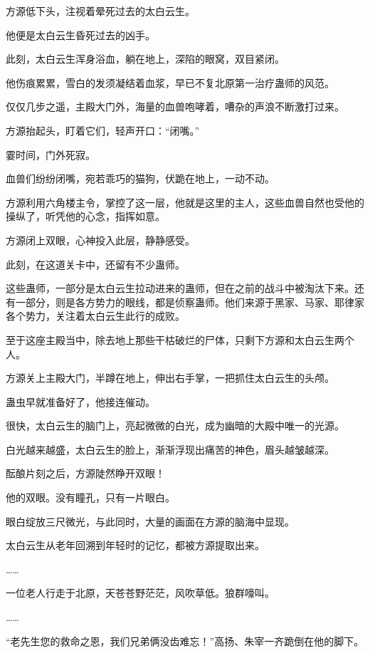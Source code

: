 
\begin{this_body}



方源低下头，注视着晕死过去的太白云生。

他便是太白云生昏死过去的凶手。

此刻，太白云生浑身浴血，躺在地上，深陷的眼窝，双目紧闭。

他伤痕累累，雪白的发须凝结着血浆，早已不复北原第一治疗蛊师的风范。

仅仅几步之遥，主殿大门外，海量的血兽咆哮着，嘈杂的声浪不断激打过来。

方源抬起头，盯着它们，轻声开口：“闭嘴。”

霎时间，门外死寂。

血兽们纷纷闭嘴，宛若乖巧的猫狗，伏跪在地上，一动不动。

方源利用六角楼主令，掌控了这一层，他就是这里的主人，这些血兽自然也受他的操纵了，听凭他的心念，指挥如意。

方源闭上双眼，心神投入此层，静静感受。

此刻，在这道关卡中，还留有不少蛊师。

这些蛊师，一部分是太白云生拉动进来的蛊师，但在之前的战斗中被淘汰下来。还有一部分，则是各方势力的眼线，都是侦察蛊师。他们来源于黑家、马家、耶律家各个势力，关注着太白云生此行的成败。

至于这座主殿当中，除去地上那些干枯破烂的尸体，只剩下方源和太白云生两个人。

方源关上主殿大门，半蹲在地上，伸出右手掌，一把抓住太白云生的头颅。

蛊虫早就准备好了，他接连催动。

很快，太白云生的脑门上，亮起微微的白光，成为幽暗的大殿中唯一的光源。

白光越来越盛，太白云生的脸上，渐渐浮现出痛苦的神色，眉头越皱越深。

酝酿片刻之后，方源陡然睁开双眼！

他的双眼。没有瞳孔，只有一片眼白。

眼白绽放三尺微光，与此同时，大量的画面在方源的脑海中显现。

太白云生从老年回溯到年轻时的记忆，都被方源提取出来。

……

一位老人行走于北原，天苍苍野茫茫，风吹草低。狼群嚎叫。

……

“老先生您的救命之恩，我们兄弟俩没齿难忘！”高扬、朱宰一齐跪倒在他的脚下。


\end{this_body}
